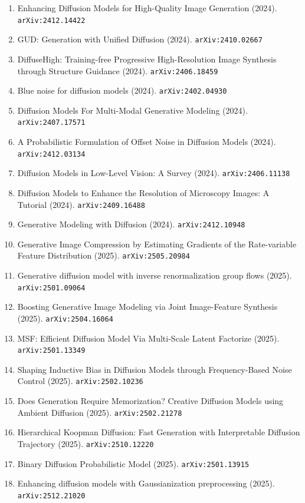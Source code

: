 \documentclass[11pt]{article}
\begin{document}
\begin{enumerate}
  \item Enhancing Diffusion Models for High-Quality Image Generation (2024). \texttt{arXiv:2412.14422}
  \item GUD: Generation with Unified Diffusion (2024). \texttt{arXiv:2410.02667}
  \item DiffuseHigh: Training-free Progressive High-Resolution Image Synthesis
  through Structure Guidance (2024). \texttt{arXiv:2406.18459}
  \item Blue noise for diffusion models (2024). \texttt{arXiv:2402.04930}
  \item Diffusion Models For Multi-Modal Generative Modeling (2024). \texttt{arXiv:2407.17571}
  \item A Probabilistic Formulation of Offset Noise in Diffusion Models (2024). \texttt{arXiv:2412.03134}
  \item Diffusion Models in Low-Level Vision: A Survey (2024). \texttt{arXiv:2406.11138}
  \item Diffusion Models to Enhance the Resolution of Microscopy Images: A
  Tutorial (2024). \texttt{arXiv:2409.16488}
  \item Generative Modeling with Diffusion (2024). \texttt{arXiv:2412.10948}
  \item Generative Image Compression by Estimating Gradients of the Rate-variable Feature Distribution (2025). \texttt{arXiv:2505.20984}
  \item Generative diffusion model with inverse renormalization group flows (2025). \texttt{arXiv:2501.09064}
  \item Boosting Generative Image Modeling via Joint Image-Feature Synthesis (2025). \texttt{arXiv:2504.16064}
  \item MSF: Efficient Diffusion Model Via Multi-Scale Latent Factorize (2025). \texttt{arXiv:2501.13349}
  \item Shaping Inductive Bias in Diffusion Models through Frequency-Based Noise
  Control (2025). \texttt{arXiv:2502.10236}
  \item Does Generation Require Memorization? Creative Diffusion Models using Ambient Diffusion (2025). \texttt{arXiv:2502.21278}
  \item Hierarchical Koopman Diffusion: Fast Generation with Interpretable Diffusion Trajectory (2025). \texttt{arXiv:2510.12220}
  \item Binary Diffusion Probabilistic Model (2025). \texttt{arXiv:2501.13915}
  \item Enhancing diffusion models with Gaussianization preprocessing (2025). \texttt{arXiv:2512.21020}

\end{enumerate}
\end{document}
